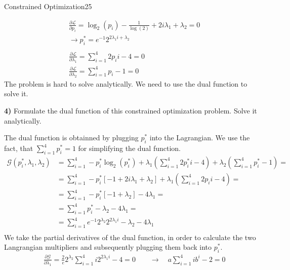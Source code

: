 \begin{questions}
\begin{question}{Constrained Optimization}{25}
\begin{answer}
\begin{equation*}
\begin{split}
& \frac{\partial\mathcal{L}}{\partial p_{i}}= \log_{2}(p_{i}) - \frac{1}{\log(2)}+2i\lambda_{1}+\lambda_{2} = 0 \\
& \rightarrow p_{i}^{*} = e^{-1}2^{2\lambda_{1}i+\lambda_{2}}\\ \\
& \frac{\partial\mathcal{L}}{\partial \lambda_{1}} = \sum_{i=1}^4 2p_{i}i - 4 = 0 \\
& \frac{\partial\mathcal{L}}{\partial \lambda_{2}} = \sum_{i=1}^4 p_{i} - 1 = 0
\end{split}
\end{equation*}
The problem is hard to solve analytically. We need to use the dual function to solve it.
\end{answer}
\textbf{4)} Formulate the dual function of this constrained optimization problem. Solve it analytically.
\\
\begin{answer}
The dual function is obtainned by plugging $p_{i}^{*}$ into the Lagrangian. We use the fact, that $\sum_{i=1}^4 p_{i}^{*} = 1$ for simplifying the dual function.\\
\begin{equation*}
\begin{split}
\mathcal{G}(p_{i}^{*},\lambda_{1},\lambda_{2}) &= \sum_{i=1}^4 - p_{i}^{*}\log_{2}(p_{i}^{*}) + \lambda_{1}(\sum_{i=1}^4 2p_{i}^{*}i - 4)+ \lambda_{2}(\sum_{i=1}^4 p_{i}^{*} - 1) = \\
& = \sum_{i=1}^4 - p_i^*[-1+2i\lambda_1+\lambda_2]+\lambda_1(\sum_{i=1}^4 2p_{i}i - 4) = \\
& = \sum_{i=1}^4 - p_i^*[-1+\lambda_2]-4\lambda_1 = \\
& = \sum_{i=1}^4 p_i^*-\lambda_2-4\lambda_1 = \\
& = \sum_{i=1}^4 e^{-1}2^{\lambda_2}2^{2\lambda_1i}-\lambda_2-4\lambda_1 \\
\end{split}
\end{equation*} 
We take the partial derivatives of the dual function, in order to calculate the two Langrangian multipliers and subsequently plugging them back into $p_{i}^{*}$.
\begin{equation*}
\begin{split}
& \frac{\partial\mathcal{G}}{\partial \lambda_1} = \frac{2}{e}2^{\lambda_2}\sum_{i=1}^4i2^{2\lambda_1i}-4 = 0 \qquad \rightarrow \quad  a\sum_{i=1}^4 i b^i -2 = 0 \\

\end{split}
\end{equation*}
\end{answer}
\end{question}
\end{questions}
